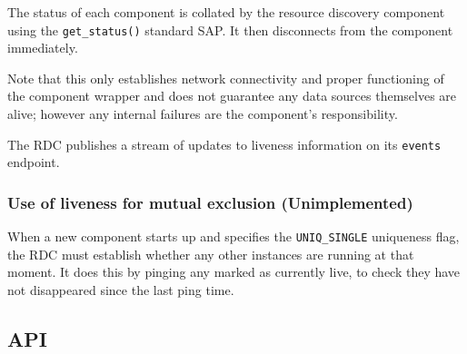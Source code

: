 \documentclass[12pt,a4paper,twoside]{article}
\renewcommand{\_}{\texttt{\symbol{95}}}
\begin{document}
The status of each component is collated by the resource
discovery component using the \verb^get_status()^ standard SAP.
It then disconnects from the component immediately.

Note that this only establishes network connectivity and proper
functioning of the component wrapper and does not guarantee any data
sources themselves are alive; however any internal failures are the
component's responsibility.

The RDC publishes a stream of updates to liveness information on its
\verb^events^ endpoint.


\subsubsection*{Use of liveness for mutual exclusion (Unimplemented)}

When a new component starts up and specifies the \verb^UNIQ_SINGLE^
uniqueness flag, the RDC must establish whether any other instances
are running at that moment. It does this by pinging any marked
as currently live, to check they have not disappeared since the
last ping time.

\subsection{API}
\end{document}

